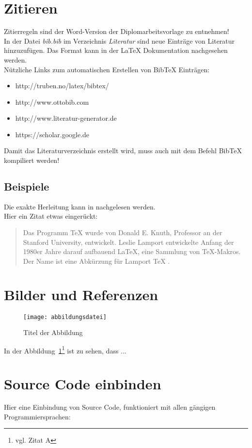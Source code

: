 \section{Zitieren}
Zitierregeln sind der Word-Version der Diplomarbeitsvorlage zu entnehmen! \\
In der Datei \textit{bib.bib} im Verzeichnis \textit{Literatur} sind neue Eintr\"age von Literatur hinzuzuf\"ugen. Das Format kann in der \LaTeX{} Dokumentation nachgesehen werden. \\
N\"utzliche Links zum automatischen Erstellen von BibTeX Eintr\"agen:
\begin{itemize}
	\item http://truben.no/latex/bibtex/
	\item http://www.ottobib.com
	\item http://www.literatur-generator.de
	\item https://scholar.google.de
\end{itemize}
Damit das Literaturverzeichnis erstellt wird, muss auch mit dem Befehl BibTeX kompiliert werden! \\
\subsection{Beispiele}
Die exakte Herleitung kann in \cite{Prager1961} nachgelesen werden. \\
Hier ein Zitat etwas einger\"uckt:
\begin{quote}
Das Programm TeX wurde von Donald E. Knuth, Professor an der Stanford University, entwickelt. Leslie Lamport entwickelte Anfang der 1980er Jahre darauf aufbauend LaTeX, eine Sammlung von TeX-Makros. Der Name ist eine Abk\"urzung für Lamport TeX \cite{latextug}.
\end{quote}

\section{Bilder und Referenzen}
\begin{figure}[htbp]
\centering
\texttt{[image: abbildungsdatei]} %
\caption{Titel der Abbildung} 
\label{fig:bild1}
\end{figure}

In der Abbildung~\ref{fig:bild1}\footnote{vgl. Zitat A\cite{referenzA}} %
ist zu sehen, dass ...

\section{Source Code einbinden}
Hier eine Einbindung von Source Code, funktioniert mit allen g\"angigen Programmiersprachen:

